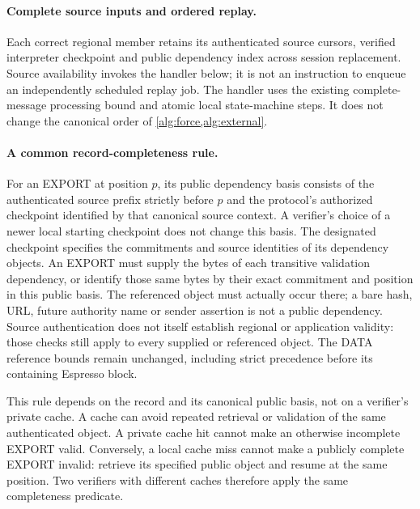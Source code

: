\paragraph{Complete source inputs and ordered replay.}
\label{sec:source-step}
Each correct regional member retains its authenticated source cursors,
verified interpreter checkpoint and public dependency index across
session replacement. Source availability invokes the handler below;
it is not an instruction to enqueue an independently scheduled replay
job. The handler uses the existing complete-message processing bound
and atomic local state-machine steps. It does not change the canonical
order of \cref{alg:force,alg:external}.

\paragraph{A common record-completeness rule.}
\label{sec:record-completeness}
For an EXPORT at position $p$, its public dependency basis consists of
the authenticated source prefix strictly before $p$ and the protocol's
authorized checkpoint identified by that canonical source context.
A verifier's choice of a newer local starting checkpoint does not change
this basis. The designated checkpoint specifies
the commitments and source identities of its dependency objects. An
EXPORT must supply the bytes of each transitive validation dependency,
or identify those same bytes by their exact commitment and position in
this public basis. The referenced object must actually occur there;
a bare hash, URL, future authority name or sender assertion is not a
public dependency. Source authentication does not itself establish
regional or application validity: those checks still apply to every
supplied or referenced object. The DATA reference bounds remain
unchanged, including strict precedence before its containing Espresso
block.

This rule depends on the record and its canonical public basis, not
on a verifier's private cache. A cache can avoid repeated retrieval or
validation of the same authenticated object. A private cache hit cannot
make an otherwise incomplete EXPORT valid. Conversely, a local cache
miss cannot make a publicly complete EXPORT invalid: retrieve its
specified public object and resume at the same position. Two verifiers
with different caches therefore apply the same completeness predicate.

